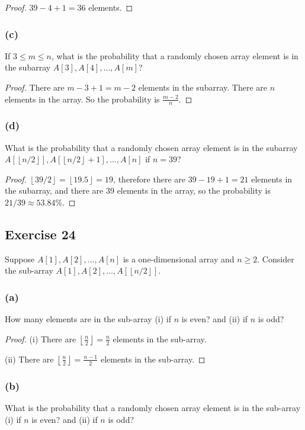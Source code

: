 \documentclass[14pt]{extarticle}
\newcommand{\floor}[1]{{\left\lfloor#1\right\rfloor}}
\begin{document}
\begin{proof}
\(39 - 4 + 1 = 36\) elements.
\end{proof}

\subsubsection{(c)}
If \(3 \leq m \leq n\), what is the probability that a randomly chosen array element is in the subarray 
\(A[3], A[4], \ldots, A[m]\)?

\begin{proof}
There are \(m - 3 + 1 = m-2\) elements in the subarray. There are $n$ elements in the array. So the probability is 
\(\frac{m-2}{n}\).
\end{proof}

\subsubsection{(d)}
What is the probability that a randomly chosen array element is in the subarray \\
\(A[\floor{n/2}], A[\floor{n/2}+1], \ldots, A[n]\) if \(n = 39\)?

\begin{proof}
\(\floor{39/2} = \floor{19.5} = 19\), therefore there are \(39 - 19 + 1 = 21\) elements in the subarray, and there 
are 39 elements in the array, so the probability is \(21/39 \approx 53.84\%\).
\end{proof}

\subsection{Exercise 24}
Suppose \(A[1], A[2], \ldots, A[n]\) is a one-dimensional array and \(n \geq 2\). Consider the sub-array 
\(A[1], A[2], \ldots, A[\floor{n/2}]\).

\subsubsection{(a)}
How many elements are in the sub-array (i) if $n$ is even? and (ii) if $n$ is odd?

\begin{proof}
(i) There are \(\floor{\frac{n}{2}} = \frac{n}{2}\) elements in the sub-array.

(ii) There are \(\floor{\frac{n}{2}} = \frac{n-1}{2}\) elements in the sub-array.
\end{proof}

\subsubsection{(b)}
What is the probability that a randomly chosen array element is in the sub-array (i) if $n$ is even? and 
(ii) if $n$ is odd?
\end{document}
